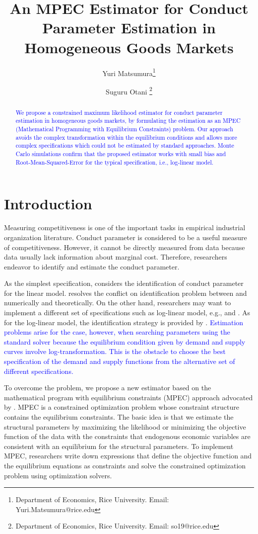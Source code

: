 \documentclass[11pt, a4paper]{article}
\title{An MPEC Estimator for Conduct Parameter Estimation in Homogeneous Goods Markets}
\author{Yuri Matsumura\thanks{Department of Economics, Rice University. Email: Yuri.Matsumura@rice.edu} \and Suguru Otani \thanks{Department of Economics, Rice University. Email: so19@rice.edu
}}
\begin{document}
\maketitle
\begin{abstract}
    \textcolor{blue}{We propose a constrained maximum likelihood estimator for conduct parameter estimation in homogeneous goods markets, by formulating the estimation as an MPEC (Mathematical Programming with Equilibrium Constraints) problem. Our approach avoids the complex transformation within the equilibrium conditions and allows more complex specifications which could not be estimated by standard approaches. Monte Carlo simulations confirm that the proposed estimator works with small bias and Root-Mean-Squared-Error for the typical specification, i.e., log-linear model.
    }
\end{abstract}


\section{Introduction}
Measuring competitiveness is one of the important tasks in empirical industrial organization literature.
Conduct parameter is considered to be a useful measure of competitiveness. 
However, it cannot be directly measured from data because data usually lack information about marginal cost.
Therefore, researchers endeavor to identify and estimate the conduct parameter.

As the simplest specification, \citet{bresnahan1982oligopoly} considers the identification of conduct parameter for the linear model. \cite{matsumura2023revisiting} resolves the conflict on identification problem between \cite{bresnahan1982oligopoly} and \cite{perloff2012collinearity} numerically and theoretically. On the other hand, researchers may want to implement a different set of specifications such as log-linear model, e.g., \cite{okazaki2022excess} and \cite{merel2009measuring}. As for the log-linear model, the identification strategy is provided by \citet{lau1982identifying}. 
\textcolor{blue}{Estimation problems arise for the case, however, when searching parameters using the standard solver because the equilibrium condition given by demand and supply curves involve log-transformation. This is the obstacle to choose the best specification of the demand and supply functions from the alternative set of different specifications.}


To overcome the problem, we propose a new estimator based on the mathematical program with equilibrium constraints (MPEC) approach advocated by \cite{su2012constrained}. MPEC is a constrained optimization problem whose constraint structure contains the equilibrium constraints. The basic idea is that we estimate the structural parameters by maximizing the likelihood or minimizing the objective function of the data with the constraints that endogenous economic variables are consistent with an equilibrium for the structural parameters. To implement MPEC, researchers write down expressions that define the objective function and the equilibrium equations as constraints and solve the constrained optimization problem using optimization solvers. 
\end{document}
